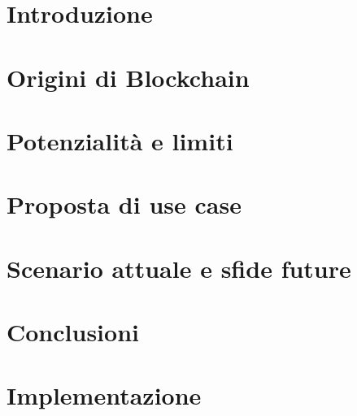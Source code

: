 \documentclass[12pt,twoside]{report}
\begin{document}






\tableofcontents
\listoffigures

\chapter{Introduzione}


\chapter{Origini di Blockchain}


\chapter{Potenzialità e limiti}


\chapter{Proposta di use case}


\chapter{Scenario attuale e sfide future}


\chapter{Conclusioni}


\appendix

\chapter{Implementazione}


{}

\end{document}
